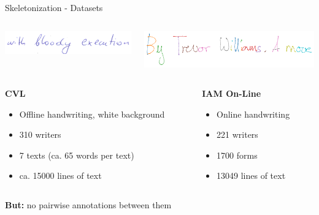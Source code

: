 \documentclass[aspectratio=169]{beamer}
\begin{document}
\begin{frame}{Skeletonization - Datasets}
\begin{columns}
\begin{column}{0.45\textwidth}
\includegraphics[width=\textwidth]{assets/cvl_vs_iam-online/cvl_0042-2-4_small.png}
\end{column}
\begin{column}{0.45\textwidth}
\includegraphics[width=\textwidth]{assets/cvl_vs_iam-online/iam-online.pdf}
\end{column}
\end{columns}
\vspace{1em}

\begin{columns}
\begin{column}{0.45\textwidth}
\textbf{CVL}
\begin{itemize}
\item Offline handwriting, white background
\item 310 writers
\item 7 texts (ca. 65 words per text)
\item ca. 15000 lines of text
\end{itemize}
\end{column}

\begin{column}{0.45\textwidth}
\textbf{IAM On-Line}
\begin{itemize}
\item Online handwriting
\item 221 writers
\item 1700 forms
\item 13049 lines of text
\end{itemize}
\end{column}
\end{columns}

\vspace{2em}
\textbf{But:} no pairwise annotations between them 
\vspace{1em}
\end{frame}
\end{document}
